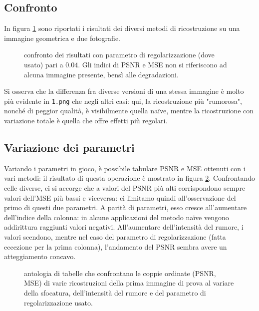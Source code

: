 \documentclass[a4paper]{article}
\begin{document}
\subsection{Confronto}
In figura \ref{fig:comparison} sono riportati i risultati dei diversi metodi di
ricostruzione su una immagine geometrica e due fotografie.
\begin{figure}\label{fig:comparison}
   \begin{center}
       \vspace*{-1.1in}
       \centerline{\scalebox{1.3}{}}
   \end{center}
   \vspace*{-0.2in}
   \caption{confronto dei risultati con parametro di regolarizzazione (dove
   usato) pari a $0.04$. Gli indici di PSNR e MSE non si riferiscono ad alcuna
   immagine presente, bensì alle degradazioni.}
\end{figure}
Si osserva che la differenza fra diverse versioni di una stessa immagine è molto
più evidente in \verb!1.png! che negli altri casi: qui, la ricostruzione più
"rumorosa", nonché di peggior qualità, è visibilmente quella naïve, mentre la
ricostruzione con variazione totale è quella che offre effetti più regolari.

\subsection{Variazione dei parametri}
Variando i parametri in gioco, è possibile tabulare PSNR e MSE ottenuti con i
vari metodi: il risultato di questa operazione è mostrato in figura
\ref{fig:parameters}.
Confrontando celle diverse, ci si accorge che a valori del PSNR più alti
corrispondono sempre valori dell'MSE più bassi e viceversa: ci limitamo quindi
all'osservazione del primo di questi due parametri. A parità di parametri, esso
cresce all'aumentare dell'indice della colonna: in alcune applicazioni del
metodo naïve vengono addirittura raggiunti valori negativi. All'aumentare
dell'intensità del rumore, i valori scendono, mentre nel caso del parametro di
regolarizzazione (fatta eccezione per la prima colonna), l'andamento del PSNR
sembra avere un atteggiamento concavo.
\begin{figure}\label{fig:parameters}
    \begin{center}
        \scalebox{0.65}{}
    \end{center}
    \begin{center}
        \scalebox{0.65}{}
    \end{center}
    \begin{center}
      \scalebox{0.65}{}
    \end{center}
  \caption{antologia di tabelle che confrontano le coppie ordinate (PSNR, MSE)
  di varie ricostruzioni della prima immagine di prova al variare della
  sfocatura, dell'intensità del rumore e del parametro di regolarizzazione
  usato.}
\end{figure}
\end{document}
